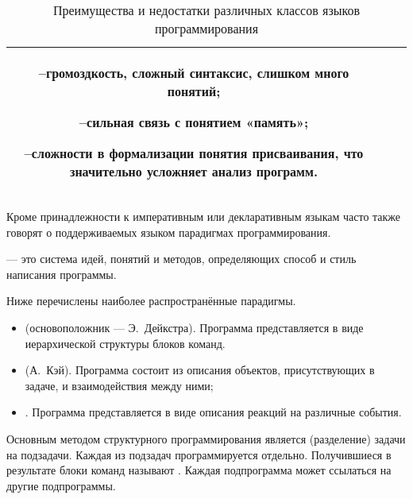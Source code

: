 \begin{table}
\begin{centering}
\begin{tabular}{|c|c|c|}
\begin{minipage}[t]{0.42\columnwidth}
        --\enskip громоздкость, сложный синтаксис, слишком много
        понятий;
        
        --\enskip сильная связь с понятием «память»;
        
        --\enskip сложности в формализации понятия присваивания, что
        значительно усложняет анализ программ.
        \par\medskip
      \end{minipage}\\
      \hline 
    \end{tabular}
    \par
  \end{centering}
  
  \caption{Преимущества и недостатки различных классов языков программирования}
  \label{tbl:PLclasses}
\end{table}

Кроме принадлежности к императивным или декларативным языкам часто
также говорят о поддерживаемых языком парадигмах программирования.

\begin{defn}
   — это
  система идей, понятий и методов, определяющих способ и стиль
  написания программы.
\end{defn}

Ниже перечислены наиболее распространённые парадигмы.

\begin{itemize}
\item {} (основоположник — Э.~Дейкстра). Программа
  представляется в виде иерархической структуры блоков команд.
\item
   (А.~Кэй). Программа состоит из описания
  объектов, присутствующих в задаче, и взаимодействия между ними;
\item
  . Программа представляется в виде описания
  реакций на различные события.
\end{itemize}

Основным методом структурного программирования является
 (разделение) задачи на
подзадачи. Каждая из подзадач программируется отдельно. Получившиеся в
результате блоки команд называют .
Каждая подпрограмма может ссылаться на другие подпрограммы.

